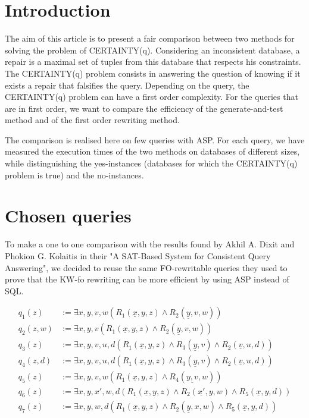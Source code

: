 
\section{Introduction}
The aim of this article is to present a fair comparison between two methods for
solving the problem of CERTAINTY(q). Considering an inconsistent database, a
repair is a maximal set of tuples from this database that respects his
constraints. The CERTAINTY(q) problem consists in answering the question of
knowing if it exists a repair that falsifies the query. Depending on the query,
the CERTAINTY(q) problem can have a first order complexity. For the queries
that are in first order, we want to compare the efficiency of the
generate-and-test method and of the first order rewriting method.

The comparison is realised here on few queries with ASP. For each query, we
have measured the execution times of the two methods on databases of different
sizes, while distinguishing the yes-instances (databases for which the
CERTAINTY(q) problem is true) and the no-instances.




\section{Chosen queries}

To make a one to one comparison with the results found by Akhil A. Dixit and Phokion G. Kolaitis in their "A SAT-Based System for Consistent Query
Answering", we decided to reuse the same FO-rewritable queries they used to
prove that the KW-fo rewriting can be more efficient by using ASP instead of
SQL.

\begin{align*}
	q_1(z)   &:= \exists x,y,v,w (R_1(\underline{x},y,z) \wedge R_2(\underline{y}, v, w))\\
	q_2(z,w) &:= \exists x,y,v (R_1(\underline{x},y,z) \wedge R_2(\underline{y},v,w))\\
	q_3(z)   &:= \exists x,y,v,u,d (R_1(\underline{x},y,z) \wedge R_3(\underline{y},v) \wedge R_2(\underline{v},u,d))\\
	q_4(z,d) &:= \exists x,y,v,u,d (R_1(\underline{x},y,z) \wedge R_3(\underline{y},v) \wedge R_2(\underline{v},u,d))\\
	q_5(z)   &:= \exists x,y,v,w (R_1(\underline{x},y,z) \wedge R_4(\underline{y,v},w))\\
	q_6(z)   &:= \exists x,y,x',w,d (R_1(\underline{x},y,z) \wedge R_2(\underline{x'},y,w) \wedge R_5(\underline{x},y,d))\\
	q_7(z)   &:= \exists x,y,w,d (R_1(\underline{x},y,z) \wedge R_2(\underline{y},x,w) \wedge R_5(\underline{x},y,d))\\
\end{align*}
